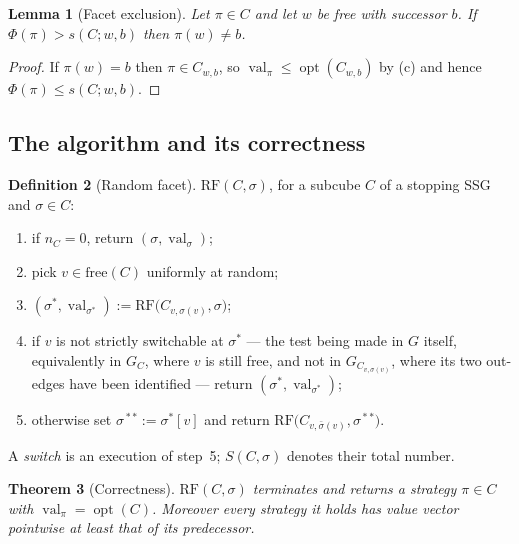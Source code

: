 \documentclass[11pt]{article}
\theoremstyle{plain}
\newtheorem{theorem}{Theorem}[section]
\newtheorem{lemma}[theorem]{Lemma}
\theoremstyle{definition}
\newtheorem{definition}[theorem]{Definition}
\DeclareMathOperator{\val}{val}
\DeclareMathOperator{\opt}{opt}
\begin{document}
\begin{lemma}[Facet exclusion]\label{lem:facet-exclusion}
Let $\pi\in C$ and let $w$ be free with successor $b$. If
$\Phi(\pi)>s(C;w,b)$ then $\pi(w)\ne b$.
\end{lemma}

\begin{proof}
If $\pi(w)=b$ then $\pi\in C_{w,b}$, so $\val_\pi\le\opt(C_{w,b})$ by
(c) and hence $\Phi(\pi)\le s(C;w,b)$.
\end{proof}

\subsection{The algorithm and its correctness}

\begin{definition}[Random facet]\label{def:rf}
$\mathrm{RF}(C,\sigma)$, for a subcube $C$ of a stopping SSG and
$\sigma\in C$:
\begin{enumerate}[label=\arabic*.,leftmargin=2.2em]
\item if $n_C=0$, return $(\sigma,\val_\sigma)$;
\item pick $v\in\mathrm{free}(C)$ uniformly at random;
\item $(\sigma^{\!*},\val_{\sigma^{\!*}}):=\mathrm{RF}\bigl(C_{v,\sigma(v)},\sigma\bigr)$;
\item if $v$ is not strictly switchable at $\sigma^{\!*}$ --- the test
  being made in $G$ itself, equivalently in $G_C$, where $v$ is still
  free, and not in $G_{C_{v,\sigma(v)}}$, where its two out-edges have
  been identified --- return
  $(\sigma^{\!*},\val_{\sigma^{\!*}})$;
\item otherwise set $\sigma^{\!**}:=\sigma^{\!*}[v]$ and return
  $\mathrm{RF}\bigl(C_{v,\bar\sigma(v)},\sigma^{\!**}\bigr)$.
\end{enumerate}
A \emph{switch} is an execution of step~5; $S(C,\sigma)$ denotes their
total number.
\end{definition}

\begin{theorem}[Correctness]\label{thm:rf-correct}
$\mathrm{RF}(C,\sigma)$ terminates and returns a strategy $\pi\in C$ with
$\val_\pi=\opt(C)$. Moreover every strategy it holds has value vector
pointwise at least that of its predecessor.
\end{theorem}
\end{document}
